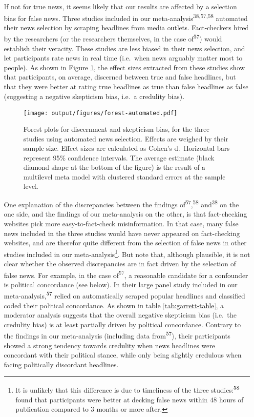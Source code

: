 \documentclass[
  man]{apa6}
\begin{document}
If not for true news, it seems likely that our results are affected by a selection bias for false news. Three studies included in our meta-analysis\textsuperscript{38,57,58} automated their news selection by scraping headlines from media outlets. Fact-checkers hired by the researchers (or the researchers themselves, in the case of\textsuperscript{57}) would establish their veracity. These studies are less biased in their news selection, and let participants rate news in real time (i.e.~when news arguably matter most to people). As shown in Figure \ref{fig:forest-automated}, the effect sizes extracted from these studies show that participants, on average, discerned between true and false headlines, but that they were better at rating true headlines as true than false headlines as false (suggesting a negative skepticism bias, i.e.~a credulity bias).



\begin{figure}
\centering
\texttt{[image: output/figures/forest-automated.pdf]}
\caption{\label{fig:forest-automated}Forest plots for discernment and skepticism bias, for the three studies using automated news selection. Effects are weighed by their sample size. Effect sizes are calculated as Cohen's d.~Horizontal bars represent 95\% confidence intervals. The average estimate (black diamond shape at the bottom of the figure) is the result of a multilevel meta model with clustered standard errors at the sample level.}
\end{figure}

One explanation of the discrepancies between the findings of\textsuperscript{57},\textsuperscript{58} and\textsuperscript{38} on the one side, and the findings of our meta-analysis on the other, is that fact-checking websites pick more easy-to-fact-check misinformation. In that case, many false news included in the three studies would have never appeared on fact-checking websites, and are therefor quite different from the selection of false news in other studies included in our meta-analysis\footnote{It is unlikely that this difference is due to timeliness of the three studies:\textsuperscript{58} found that participants were better at decking false news within 48 hours of publication compared to 3 months or more after.}. But note that, although plausible, it is not clear whether the observed discrepancies are in fact driven by the selection of false news. For example, in the case of\textsuperscript{57}, a reasonable candidate for a confounder is political concordance (see below). In their large panel study included in our meta-analysis,\textsuperscript{57} relied on automatically scraped popular headlines and classified coded their political concordance. As shown in table \ref{tab:garrett-table}, a moderator analysis suggests that the overall negative skepticism bias (i.e.~the credulity bias) is at least partially driven by political concordance. Contrary to the findings in our meta-analysis (including data from\textsuperscript{57}), their participants showed a strong tendency towards credulity when news headlines were concordant with their political stance, while only being slightly credulous when facing politically discordant headlines.
\end{document}
